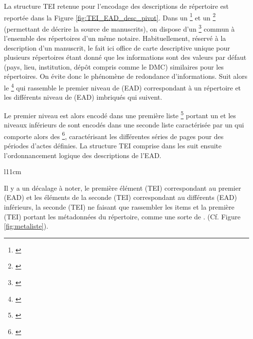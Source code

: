 La structure TEI retenue pour l'encodage des descriptions de répertoire est reportée dans la Figure \ref{fig:TEI_EAD_desc_pivot}. Dans un \footnote{\cite{tei_tei_nodate-6}} et un \footnote{\cite{tei_tei_nodate-4}} (permettant de décrire la source de manuscrits), on dispose d'un \footnote{\cite{tei_tei_nodate-22}} commun à l'ensemble des répertoires d'un même notaire. Habituellement, réservé à la description d'un manuscrit, le  fait ici office de carte descriptive unique pour plusieurs répertoires étant donné que les informations sont des valeurs par défaut (pays, lieu, institution, dépôt compris comme le DMC) similaires pour les répertoires. On évite donc le phénomène de redondance d'informations. Suit alors le \footnote{\cite{tei_tei_nodate-5}} qui rassemble le premier niveau de  (EAD) correspondant à un répertoire et les différents niveau de  (EAD) imbriqués qui suivent. 

Le premier niveau est alors encodé dans une première liste \footnote{\cite{tei_tei_nodate-21}} portant un   et les niveaux inférieurs de  sont encodés dans une seconde liste  caractérisée par un   qui comporte alors des \footnote{\cite{tei_tei_nodate-20}}, caractérisant les différentes séries de pages pour des périodes d'actes définies. La structure TEI comprise dans les  suit ensuite l'ordonnancement logique des descriptions de l'EAD.

\begin{wrapfigure}[20]{l}{11cm}
    \centering
    \centerline{}
    \caption{Imbrication des deux niveaux de  dans le  \textcopyright L. Terriel, 2020, Diagrams.net}
    \label{fig:metaliste}
\end{wrapfigure}

Il y a un décalage à noter, le première élément  (TEI) correspondant au premier  (EAD) et les éléments  de la seconde  (TEI) correspondant au différents  (EAD) inférieurs, la seconde  (TEI) ne faisant que rassembler les items et la première  (TEI) portant les métadonnées du répertoire, comme une sorte de . (Cf. Figure \ref{fig:metaliste}).\\

